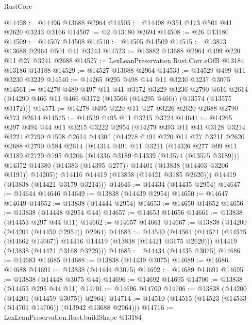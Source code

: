\begin{lexlean}{RustCore}
\begin{coremodule}
@14498 := @14496 @13688 @2964
@14505 := @14498 @351 @173 @501 @41 @2620 @3243 @3166
@14507 := @2 @13180 @2694
@14508 := @26 @13180
@14509 := @14507 @14508
@14510 := @14505 @14509
@14515 := @13873 @13688 @2964 @501 @41 @3243
@14523 := @13882 @13688 @2964 @499 @220 @11 @27 @3241 @2688
@14527 := LexLeanPreservation.Rust.Corr.eOfB @13184 @13186 @13188
@14529 := @14527 @13688 @2964
@14533 := @14529 @499 @11 @3230 @3239
@14540 := @14265 @295 @498 @44 @11 @3230 @3237 @3075
@14561 := @14278
    @489
    @497
    @11
    @41
    @3172
    @3229
    @3236
    @2790
    @616
    @2614
    (@14290 @466 @11 @466 @3172 (@13566 (@14295 @466)) (@13574 (@13575 @3172)))
@14571 := @14278 @495 @220 @11 @27 @3226 @2620 @2688 @2790 @573 @2614
@14575 := @14529 @495 @11 @3215 @3224
@14644 := @14265
    @297
    @494
    @44
    @11
    @3215
    @3222
    @2954
    (@14279
      @493
      @11
      @41
      @3128
      @3214
      @3221
      @2790
      @1598
      @2614
      @14301
      (@14278
        @491
        @220
        @11
        @27
        @3211
        @2620
        @2688
        @2790
        @584
        @2614
        (@14314
          @491
          @11
          @3211
          (@14326
            @277
            @99
            @11
            @3189
            @2729
            @795
            @3206
            (@14336 @3189 @14339 (@13574 (@13575 @3189)))
            @14372
            @14380
            (@14383 (@14395 @277))
            @14401
            (@13838 (@14403 @3206 @3191))
            @14205))
        @14416
        @14419
        (@13838 (@14421 @3185 @2620)))
      @14419
      (@13838 (@14421 @3179 @3214)))
@14646 := @14434 (@14435 @2954)
@14647 := @14644 @14646
@14649 := @13838 (@14439 @2954)
@14650 := @14647 @14649
@14652 := @13838 (@14444 @2954)
@14653 := @14650 @14652
@14656 := @13838 (@14448 @2954 @44)
@14657 := @14653 @14656
@14661 := @13838 (@14453 @297 @44 @11)
@14662 := @14657 @14661
@14667 := @13838 (@14200 (@14201 (@14459 @2954)) @2964)
@14683 := @14540
    (@14561
      (@14571 (@14575 (@14662 @14667)) @14416 @14419 (@13838 (@14421 @3175 @2620)))
      @14419
      (@13838 (@14421 @3168 @3229)))
@14685 := @14434 (@14435 @3075)
@14686 := @14683 @14685
@14688 := @13838 (@14439 @3075)
@14689 := @14686 @14688
@14691 := @13838 (@14444 @3075)
@14692 := @14689 @14691
@14695 := @13838 (@14448 @3075 @44)
@14696 := @14692 @14695
@14700 := @13838 (@14453 @295 @44 @11)
@14701 := @14696 @14700
@14706 := @13838 (@14200 (@14201 (@14459 @3075)) @2964)
@14714 := @14510 (@14515 (@14523 (@14533 (@14701 @14706)) (@13942 @13688 @2964)))
@14716 := LexLeanPreservation.Rust.buildShape @13184

\end{coremodule}
\end{lexlean}
